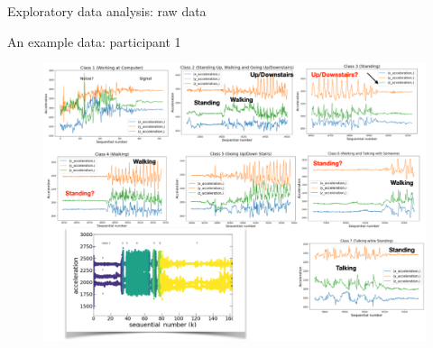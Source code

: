 \documentclass{if-beamer}
\begin{document}
\begin{frame}{Exploratory data analysis: raw data}
        \begin{block}{An example data: participant 1}
                     \begin{figure}
                \includegraphics[scale=0.35]{./figs/paricipant01.png}
                \end{figure} 
   	 \end{block}
	
\end{frame}
\end{document}

